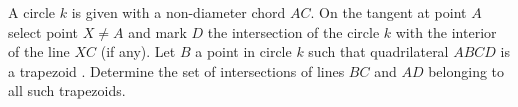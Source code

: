 A circle $k$ is given with a non-diameter chord $AC$.  On the tangent at point $A$ select point $X \ne A$ and mark $D$ the intersection of the circle $k$ with the interior of the line $XC$ (if any). Let $B$ a point in circle $k$ such that quadrilateral $ABCD$ is a trapezoid . Determine the set of intersections of lines $BC$ and $AD$ belonging to all such trapezoids.